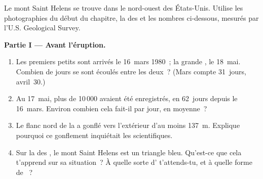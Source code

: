 \begin{problem}
\label{pb:g7:volcanoes:1}

Le mont Saint Helens se trouve dans le nord-ouest des États-Unis. Utilise
les photographies du début du chapitre, la  des  et les
nombres ci-dessous, mesurés par l'U.S. Geological Survey.

\medskip
\noindent\textbf{Partie I --- Avant l'éruption.}
\begin{enumerate}
  \item Les premiers petits  sont arrivés le 16~mars 1980~; la grande
        , le 18~mai. Combien de jours se sont écoulés entre les
        deux~? (Mars compte 31~jours, avril~30.)
  \item Au 17~mai, plus de 10\,000  avaient été enregistrés, en
        62~jours depuis le 16~mars. Environ combien cela fait-il par jour,
        en moyenne~?
  \item Le flanc nord de la  a gonflé vers l'extérieur d'au moins
        \qty{137}{m}. Explique pourquoi ce gonflement inquiétait les
        scientifiques.
  \item Sur la  des , le mont Saint Helens est un triangle
        bleu. Qu'est-ce que cela t'apprend sur sa situation~? À quelle sorte
        d' t'attends-tu, et à quelle forme de ~?
\end{enumerate}


\end{problem}
